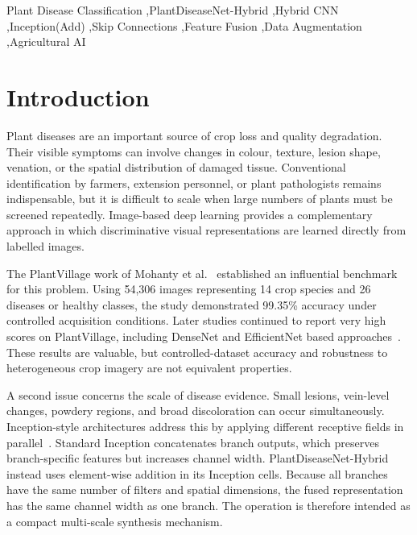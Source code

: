 \documentclass[a4paper,fleqn]{cas-dc}
\begin{document}
\begin{keywords}
Plant Disease Classification \sep PlantDiseaseNet-Hybrid \sep Hybrid CNN \sep Inception(Add) \sep Skip Connections \sep Feature Fusion \sep Data Augmentation \sep Agricultural AI
\end{keywords}
\maketitle

\section{Introduction}
Plant diseases are an important source of crop loss and quality degradation. Their visible symptoms can involve changes in colour, texture, lesion shape, venation, or the spatial distribution of damaged tissue. Conventional identification by farmers, extension personnel, or plant pathologists remains indispensable, but it is difficult to scale when large numbers of plants must be screened repeatedly. Image-based deep learning provides a complementary approach in which discriminative visual representations are learned directly from labelled images.

The PlantVillage work of Mohanty et al.~\citep{mohanty2016} established an influential benchmark for this problem. Using 54,306 images representing 14 crop species and 26 diseases or healthy classes, the study demonstrated 99.35\% accuracy under controlled acquisition conditions. Later studies continued to report very high scores on PlantVillage, including DenseNet and EfficientNet based approaches~\citep{too2019,atila2021}. These results are valuable, but controlled-dataset accuracy and robustness to heterogeneous crop imagery are not equivalent properties.

A second issue concerns the scale of disease evidence. Small lesions, vein-level changes, powdery regions, and broad discoloration can occur simultaneously. Inception-style architectures address this by applying different receptive fields in parallel~\citep{szegedy2015}. Standard Inception concatenates branch outputs, which preserves branch-specific features but increases channel width. PlantDiseaseNet-Hybrid instead uses element-wise addition in its Inception cells. Because all branches have the same number of filters and spatial dimensions, the fused representation has the same channel width as one branch. The operation is therefore intended as a compact multi-scale synthesis mechanism.
\end{document}
